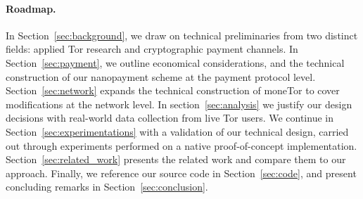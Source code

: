 \paragraph*{Roadmap.} In Section~\ref{sec:background}, we draw on technical
preliminaries from two distinct fields: applied Tor research and cryptographic
payment channels.
In Section~\ref{sec:payment}, we outline economical considerations, and the
technical construction of our nanopayment scheme at the payment protocol level.
Section~\ref{sec:network} expands the technical construction of moneTor to cover
modifications at the network level. In section~\ref{sec:analysis} we justify our
design decisions with real-world data collection from live Tor users. We
continue in Section~\ref{sec:experimentations} with a validation of our
technical design, carried out through experiments performed on a native
proof-of-concept implementation. Section~\ref{sec:related_work} presents the
related work and compare them to our approach. Finally, we reference our source
code in Section~\ref{sec:code}, and present concluding remarks in
Section~\ref{sec:conclusion}.

